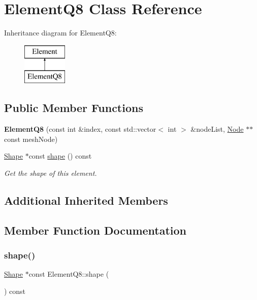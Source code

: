 \hypertarget{class_element_q8}{}\section{Element\+Q8 Class Reference}
\label{class_element_q8}
Inheritance diagram for Element\+Q8\+:\begin{figure}[H]
\begin{center}
\leavevmode
\includegraphics[height=2.000000cm]{class_element_q8}
\end{center}
\end{figure}
\subsection*{Public Member Functions}
\begin{DoxyCompactItemize}
\item 
\mbox{\label{class_element_q8_a62c1f93cb438055e8412b3f957e72a20}} 
{\bfseries Element\+Q8} (const int \&index, const std\+::vector$<$ int $>$ \&node\+List, \mbox{\hyperlink{class_node}{Node}} $\ast$$\ast$const mesh\+Node)
\item 
\mbox{\hyperlink{class_shape}{Shape}} $\ast$const \mbox{\hyperlink{class_element_q8_a1d2c3824da803df5eb9cdd36acf48874}{shape}} () const
\begin{DoxyCompactList}\small\item\em Get the shape of this element. \end{DoxyCompactList}\end{DoxyCompactItemize}
\subsection*{Additional Inherited Members}


\subsection{Member Function Documentation}
\mbox{\label{class_element_q8_a1d2c3824da803df5eb9cdd36acf48874}} 
\subsubsection{\texorpdfstring{shape()}{shape()}}
{\footnotesize\ttfamily \mbox{\hyperlink{class_shape}{Shape}} $\ast$const Element\+Q8\+::shape (\begin{DoxyParamCaption}{ }\end{DoxyParamCaption}) const\hspace{0.3cm}{\ttfamily [virtual]}}



